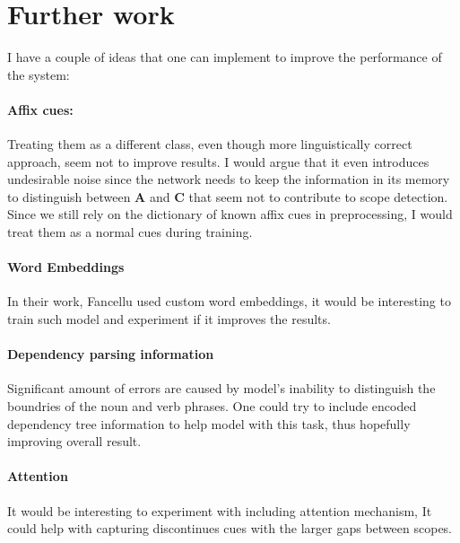\documentclass{article}
\begin{document}
\section{Further work}
I have a couple of ideas that one can implement to improve the performance of the system:
\paragraph{Affix cues:} Treating them as a different class, even though more linguistically correct
approach, seem not to improve results. I would argue that it even introduces undesirable noise since
the network needs to keep the information in its memory to distinguish between \textbf{A} and \textbf{C}
that seem not to contribute to scope detection. Since we still rely on the dictionary of known affix cues
in preprocessing, I would treat them as a normal cues during training.
\paragraph{Word Embeddings} In their work, Fancellu used custom word embeddings, it would be interesting
to train such model and experiment if it improves the results.
\paragraph{Dependency parsing information} Significant amount of errors are caused by model's inability to
distinguish the boundries of the noun and verb phrases. One could try to include encoded dependency tree information
to help model with this task, thus hopefully improving overall result.
\paragraph{Attention} It would be interesting to experiment with including attention mechanism, It could
help with capturing discontinues cues with the larger gaps between scopes.
\end{document}
